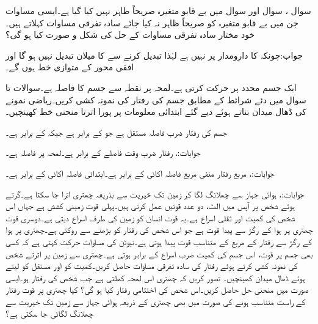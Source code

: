 سوال ، سوال  اور سوال  میں بے قابو متغیرہ  صریحاً  ظاہر نہیں کیا گیا ہے۔ایسی مساوات جن میں بے قابو متغیرہ کو صریحاً ظاہر نہ کیا جائے  سادہ تفرقی مساوات کہلاتے ہیں۔ خود مختار سادہ تفرقی مساوات کے   حل  کی شکل و صورت کیا ہو گی؟

جواب:چونکہ  کا دارومدار  پر نہیں ہے لہٰذا  تبدیل کرنے سے  کا میلان تبدیل نہیں ہو گا اور  افقی محور کے متوازی خط ہوں گے۔ 

ایک جسم  محدد پر حرکت کرتی ہے۔لمحہ  پر نقطہ  سے جسم کا فاصلہ  ہے۔سوالات  تا سوال  میں دئے شرائط کے مطابق جسم کی رفتار کی نمونہ کشی کریں۔ریاضی نمونے کی ڈھال میدان بناتے ہوئے  دیے گئے ابتدائی معلومات پر پورا اترتا منحنی خط کھینچیں۔ 

جسم کی رفتار ضرب فاصلہ  مستقل ہے جو  کے برابر ہے جبکہ  کے برابر ہے۔

جوابات:، 
رفتار ضرب وقت فاصلے کے برابر ہے۔لمحہ  پر فاصلہ  ہے۔

جوابات:، 
مربع رفتار منفی مربع فاصلہ اکائی کے برابر ہے۔ابتدائی فاصلہ اکائی کے برابر ہے۔

جوابات:، 
ہوائی جہاز سے چھلانگ لگا کر زمین تک خیریت سے بذریعہ چھتری  اترا جا سکتا ہے۔گرتے ہوئے شخص پر آپس میں الٹ، دو عدد قوتیں عمل کرتی ہیں۔پہلی قوت زمینی کشش  ہے جہاں  اس شخص کی کمیت اور  ثقلی اسراع ہے۔یہ قوت انسان کو زمین کی طرف اسراع دیتی ہے۔دوسری قوت چھتری پر ہوا کے رگڑ سے پیدا قوت ہے جو اس شخص کی رفتار کو بڑھنے سے روکتی ہے۔چھتری پر ہوا کے رگڑ سے رفتار کے مربع کے متناسب قوت  پیدا ہوتی ہے۔نیوٹن کی مساوات حرکت کہتی ہے کہ کسی بھی جسم پر قوت، اس جسم کی کمیت ضرب اسراع کے برابر ہوتی ہے۔چھتری سے زمین پر اترتے شخص کی نمونہ کشی کرتے ہوئے رفتار  کی سادہ تفرقی مساوات حاصل کریں۔کمیت کو  اور مستقل کو  لیتے ہوئے ڈھال میدان کھینچیں۔ تصور کریں کہ چھتری اس لمحہ کھلتی ہے جب شخص کی رفتار  ہو۔ایسی صورت میں منحنی حل حاصل کریں۔اس شخص کی اختتامی رفتار کیا ہو گی؟ کیا چھتری پر قوت رفتار کے راست متناسب ہونے کی صورت میں بھی چھتری کے ذریعہ ہوائی جہاز سے زمین تک خیریت سے چھلانگ لگائی جا سکتی ہے؟

